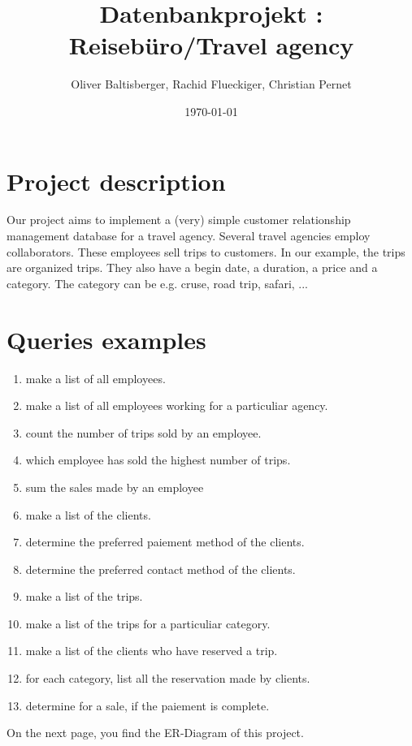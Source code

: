 \documentclass{article}
\title{Datenbankprojekt : Reisebüro/Travel agency}
\author{Oliver Baltisberger, Rachid Flueckiger, Christian Pernet}
\date{\today}
\begin{document}
	\maketitle
	
	\section*{Project description}
	Our project aims to implement a (very) simple customer relationship management database for a travel agency. 
	Several travel agencies employ collaborators. These employees sell trips to customers. 
	In our example, the trips are organized trips. They also have a begin date, a duration, a price and a category. 
	The category can be e.g. cruse, road trip, safari, ...
	
	\section*{Queries examples}
	\begin{enumerate}
		\item make a list of all employees.
		\item make a list of all employees working for a particuliar agency.
		\item count the number of trips sold by an employee.
		\item which employee has sold the highest number of trips.
		\item sum the sales made by an employee
		\item make a list of the clients.
		\item determine the preferred paiement method of the clients.
		\item determine the preferred contact method of the clients.
		\item make a list of the trips.
		\item make a list of the trips for a particuliar category.
		\item make a list of the clients who have reserved a trip.
		\item for each category, list all the reservation made by clients.
		\item determine for a sale, if the paiement is complete.
	\end{enumerate}
	
	\vspace{2 cm}
	On the next page, you find the ER-Diagram of this project. 
	
	
	\newpage
	
\end{document}
